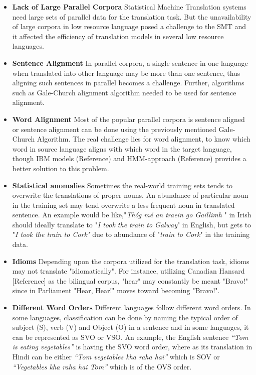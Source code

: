 \begin{itemize}
    \item \textbf{Lack of Large Parallel Corpora}   Statistical Machine Translation systems need large sets of parallel data for the translation task. But the unavailability of large corpora in low resource language posed a challenge to the SMT and it affected the efficiency of translation models in several low resource languages.
    \item\textbf{Sentence Alignment }   In parallel corpora, a single sentence in one language when translated into other language may be more than one sentence, thus aligning such sentences in parallel becomes a challenge. Further, algorithms such as Gale-Church alignment algorithm needed to be used for sentence alignment.
     \item\textbf{Word Alignment }      Most of the popular parallel corpora is sentence aligned or sentence alignment can be done using the previously mentioned Gale-Church Algorithm. The real challenge lies for word alignment, to know which word in source language aligns with which word in the target language, though IBM models (Reference) and HMM-approach (Reference) provides a better solution to this problem.
     \item\textbf{Statistical anomalies }  Sometimes the real-world training sets tends to overwrite the translations of proper nouns. An abundance of particular noun in the training set may tend overwrite a less frequent noun in translated sentence. An example would be like,"\textit{Thóg mé an traein go Gaillimh} " in Irish should ideally translate to "\textit{I took the train to Galway}" in English, but gets to "\textit{I took the train to Cork"} due to abundance of "\textit{train to Cork}" in the training data.
     \item\textbf{Idioms }Depending upon the corpora utilized for the translation task, idioms may not translate "idiomatically". For instance, utilizing Canadian Hansard [Reference] as the bilingual corpus, "hear" may constantly be meant "Bravo!" since in Parliament "Hear, Hear!" moves toward becoming "Bravo!". 
     \item\textbf{Different Word Orders}    Different languages follow different word orders. In some languages, classification can be done by naming the typical order of subject (S), verb (V) and Object (O) in a sentence and in some languages, it can be represented as SVO or VSO. An example, the English sentence \textit{“Tom is eating vegetables”} is having the SVO word order, where as its translation in Hindi can be either \textit{“Tom vegetables kha raha hai”} which is SOV or \textit{“Vegetables kha raha hai Tom”} which is of the OVS order. 

\end{itemize}
